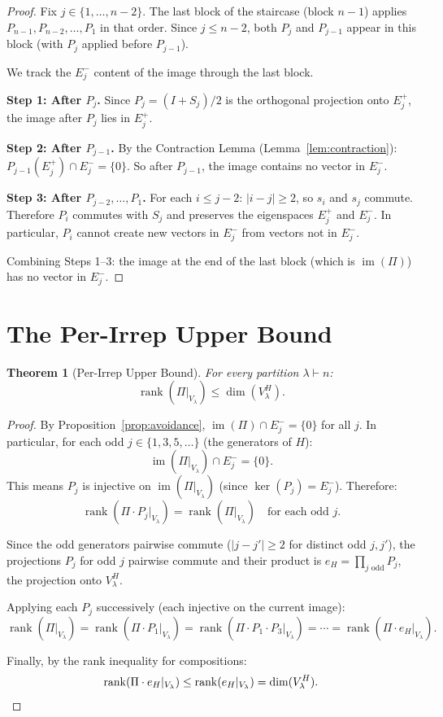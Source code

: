 \documentclass[11pt]{article}
\newtheorem{theorem}{Theorem}
\theoremstyle{definition}
\theoremstyle{remark}
\newcommand{\rank}{\operatorname{rank}}
\newcommand{\im}{\operatorname{im}}
\begin{document}
\begin{proof}
Fix $j \in \{1, \ldots, n-2\}$. The last block of the staircase
(block $n-1$) applies $P_{n-1}, P_{n-2}, \ldots, P_1$ in that order.
Since $j \leq n-2$, both $P_j$ and $P_{j-1}$ appear in this block
(with $P_j$ applied before $P_{j-1}$).

We track the $E_j^-$ content of the image through the last block.

\textbf{Step 1: After $P_j$.}
Since $P_j = (I + S_j)/2$ is the orthogonal projection onto $E_j^+$,
the image after $P_j$ lies in $E_j^+$.

\textbf{Step 2: After $P_{j-1}$.}
By the Contraction Lemma (Lemma~\ref{lem:contraction}):
$P_{j-1}(E_j^+) \cap E_j^- = \{0\}$.
So after $P_{j-1}$, the image contains no vector in $E_j^-$.

\textbf{Step 3: After $P_{j-2}, \ldots, P_1$.}
For each $i \leq j-2$: $|i - j| \geq 2$, so $s_i$ and $s_j$ commute.
Therefore $P_i$ commutes with $S_j$ and preserves the eigenspaces
$E_j^+$ and $E_j^-$. In particular, $P_i$ cannot create new vectors
in $E_j^-$ from vectors not in $E_j^-$.

Combining Steps 1--3: the image at the end of the last block (which is
$\im(\Pi)$) has no vector in $E_j^-$.
\end{proof}

\section{The Per-Irrep Upper Bound}

\begin{theorem}[Per-Irrep Upper Bound]\label{thm:upper}
For every partition $\lambda \vdash n$:
\[
\rank(\Pi|_{V_\lambda}) \leq \dim(V_\lambda^H).
\]
\end{theorem}

\begin{proof}
By Proposition~\ref{prop:avoidance}, $\im(\Pi) \cap E_j^- = \{0\}$
for all $j$. In particular, for each odd $j \in \{1, 3, 5, \ldots\}$
(the generators of $H$):
\[
\im(\Pi|_{V_\lambda}) \cap E_j^- = \{0\}.
\]
This means $P_j$ is injective on $\im(\Pi|_{V_\lambda})$
(since $\ker(P_j) = E_j^-$). Therefore:
\[
\rank(\Pi \cdot P_j |_{V_\lambda}) = \rank(\Pi|_{V_\lambda})
\quad \text{for each odd } j.
\]

Since the odd generators pairwise commute ($|j - j'| \geq 2$ for
distinct odd $j, j'$), the projections $P_j$ for odd $j$ pairwise commute
and their product is $e_H = \prod_{j \text{ odd}} P_j$, the projection
onto $V_\lambda^H$.

Applying each $P_j$ successively (each injective on the current image):
\[
\rank(\Pi|_{V_\lambda})
= \rank(\Pi \cdot P_1 |_{V_\lambda})
= \rank(\Pi \cdot P_1 \cdot P_3 |_{V_\lambda})
= \cdots
= \rank(\Pi \cdot e_H |_{V_\lambda}).
\]

Finally, by the rank inequality for compositions:
\[
\rank(\Pi \cdot e_H |_{V_\lambda})
\leq \rank(e_H |_{V_\lambda})
= \dim(V_\lambda^H). \qedhere
\]
\end{proof}
\end{document}
